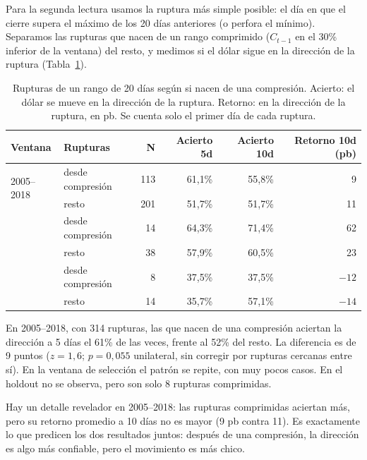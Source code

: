 \documentclass[10pt,a4paper]{article}
\begin{document}
Para la segunda lectura usamos la ruptura más simple posible: el día en que el cierre
supera el máximo de los 20 días anteriores (o perfora el mínimo). Separamos las rupturas
que nacen de un rango comprimido ($C_{t-1}$ en el 30\% inferior de la ventana) del resto,
y medimos si el dólar sigue en la dirección de la ruptura (Tabla~\ref{tab:comp_dir}).

\begin{table}[htb]\centering\small
\begin{tabular}{@{}llrrrr@{}}
\toprule
Ventana & Rupturas & N & Acierto 5d & Acierto 10d & Retorno 10d (pb) \\
\midrule
\multirow{2}{*}{2005--2018} & desde compresión & 113 & 61{,}1\% & 55{,}8\% & 9 \\
                            & resto            & 201 & 51{,}7\% & 51{,}7\% & 11 \\
\addlinespace
\multirow{2}{*}{Selección}  & desde compresión & 14  & 64{,}3\% & 71{,}4\% & 62 \\
                            & resto            & 38  & 57{,}9\% & 60{,}5\% & 23 \\
\addlinespace
\multirow{2}{*}{Holdout (control)} & desde compresión & 8 & 37{,}5\% & 37{,}5\% & $-12$ \\
                            & resto            & 14  & 35{,}7\% & 57{,}1\% & $-14$ \\
\bottomrule
\end{tabular}
\caption{Rupturas de un rango de 20 días según si nacen de una compresión. Acierto: el
dólar se mueve en la dirección de la ruptura. Retorno: en la dirección de la ruptura, en
pb. Se cuenta solo el primer día de cada ruptura.}\label{tab:comp_dir}
\end{table}

En 2005--2018, con 314 rupturas, las que nacen de una compresión aciertan la dirección a
5 días el 61\% de las veces, frente al 52\% del resto. La diferencia es de 9 puntos
($z=1{,}6$; $p=0{,}055$ unilateral, sin corregir por rupturas cercanas entre sí). En la
ventana de selección el patrón se repite, con muy pocos casos. En el holdout no se
observa, pero son solo 8 rupturas comprimidas.

Hay un detalle revelador en 2005--2018: las rupturas comprimidas aciertan más, pero su
retorno promedio a 10 días no es mayor (9 pb contra 11). Es exactamente lo que predicen
los dos resultados juntos: después de una compresión, la dirección es algo más confiable,
pero el movimiento es más chico.
\end{document}
